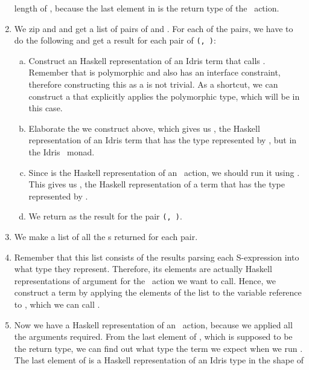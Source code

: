 \begin{enumerate}
    length of , because the last element in  is the
    return type of the \Elab\ action.
  \item We zip  and  and get a list of pairs of
     and .
    For each of the pairs, we have to do the following and get a result for
    each pair of \texttt{(, )}:
    \begin{enumerate}[(a)]
      \item \label{item:fromEditor} Construct an Haskell representation of an
        Idris term that calls . Remember that  is
        polymorphic and also has an interface constraint, therefore
        constructing this as a  is not trivial.  As a shortcut, we can
        construct a  that explicitly applies the polymorphic type,
        which will be  in this case.
      \item Elaborate the  we construct above, which gives us
        , the Haskell representation of an Idris term that has the type
        represented by , but in the Idris \Elab\ monad.
      \item Since  is the Haskell representation of an \Elab\ action,
        we should run it using . This gives us , the
        Haskell representation of a term that has the type represented by
        .
      \item We return  as the result for the pair
        \texttt{(, )}.
    \end{enumerate}
  \item We make a list of all the s returned for each pair.
  \item Remember that this list consists of the results parsing each
    S-expression into what type they represent. Therefore, its elements are
    actually Haskell representations of argument for the \Elab\ action we want
    to call. Hence, we construct a term by applying the elements of the list to
    the variable reference to , which we can call .
  \item \label{item:extract}
    Now we have a Haskell representation of an \Elab\ action, because we
    applied all the arguments required.  From the last element of
    , which is supposed to be the return type, we can find out
    what type the term we expect when we run .  The last element of
     is a Haskell representation of an Idris type in the shape of

\end{enumerate}
